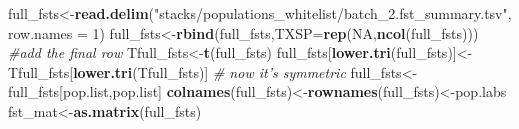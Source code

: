 \documentclass[11pt,]{article}
\newenvironment{Shaded}{\begin{snugshade}}{\end{snugshade}}
\newcommand{\KeywordTok}[1]{\textcolor[rgb]{0.13,0.29,0.53}{\textbf{#1}}}
\newcommand{\DataTypeTok}[1]{\textcolor[rgb]{0.13,0.29,0.53}{#1}}
\newcommand{\DecValTok}[1]{\textcolor[rgb]{0.00,0.00,0.81}{#1}}
\newcommand{\StringTok}[1]{\textcolor[rgb]{0.31,0.60,0.02}{#1}}
\newcommand{\CommentTok}[1]{\textcolor[rgb]{0.56,0.35,0.01}{\textit{#1}}}
\newcommand{\OtherTok}[1]{\textcolor[rgb]{0.56,0.35,0.01}{#1}}
\newcommand{\NormalTok}[1]{#1}
\begin{document}
\begin{Shaded}
\begin{Highlighting}[]
\NormalTok{full_fsts<-}\KeywordTok{read.delim}\NormalTok{(}\StringTok{"stacks/populations_whitelist/batch_2.fst_summary.tsv"}\NormalTok{,}
                      \DataTypeTok{row.names =} \DecValTok{1}\NormalTok{)}
\NormalTok{full_fsts<-}\KeywordTok{rbind}\NormalTok{(full_fsts,}\DataTypeTok{TXSP=}\KeywordTok{rep}\NormalTok{(}\OtherTok{NA}\NormalTok{,}\KeywordTok{ncol}\NormalTok{(full_fsts))) }\CommentTok{#add the final row}
\NormalTok{Tfull_fsts<-}\KeywordTok{t}\NormalTok{(full_fsts)}
\NormalTok{full_fsts[}\KeywordTok{lower.tri}\NormalTok{(full_fsts)]<-Tfull_fsts[}\KeywordTok{lower.tri}\NormalTok{(Tfull_fsts)] }\CommentTok{# now it's symmetric}
\NormalTok{full_fsts<-full_fsts[pop.list,pop.list]}
\KeywordTok{colnames}\NormalTok{(full_fsts)<-}\KeywordTok{rownames}\NormalTok{(full_fsts)<-pop.labs}
\NormalTok{fst_mat<-}\KeywordTok{as.matrix}\NormalTok{(full_fsts)}
\end{Highlighting}
\end{Shaded}
\end{document}
